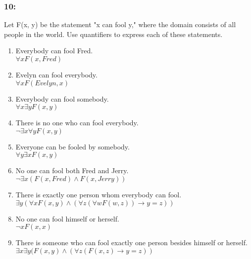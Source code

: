 \documentclass[12pt,en,a4paper]{report}
\begin{document}
	\subsubsection*{10:}
	Let F(x, y) be the statement "x can fool y," where the domain consists of all people in the world. Use quantifiers to express each of these statements.
	\begin{enumerate}[label=\textbf{\alph*)}]
		\item Everybody can fool Fred.\\
		$\forall x F(x, Fred)$
		\item Evelyn can fool everybody.\\
		$\forall x F(Evelyn, x)$
		\item Everybody can fool somebody.\\
		$\forall x \exists y F(x, y)$
		\item There is no one who can fool everybody.\\
		$\neg \exists x \forall y F(x, y)$
		\item Everyone can be fooled by somebody.\\
		$\forall y \exists x F(x, y)$
		\item No one can fool both Fred and Jerry.\\
		$\neg \exists x (F(x, Fred) \wedge F(x, Jerry))$
		\item There is exactly one person whom everybody can fool.\\
		$\exists y (\forall x F(x, y) \wedge (\forall z (\forall w F(w, z))\rightarrow y=z))$
		\item No one can fool himself or herself.\\
		$\neg x F(x, x)$
		\item There is someone who can fool exactly one person besides himself or herself.\\
		$\exists x \exists y (F(x, y) \wedge (\forall z (F(x, z) \rightarrow y = z))$
	\end{enumerate}
\end{document}
